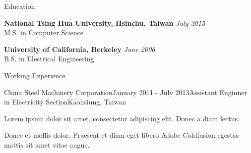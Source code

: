 \documentclass{resume} %
\begin{document}

\begin{rSection}{Education}

{\bf National Tsing Hua University, Hsinchu, Taiwan} \hfill {\em July 2015} \\ 
M.S. in Computer Science

{\bf University of California, Berkeley} \hfill {\em June 2006} \\ 
B.S. in Electrical Engineering

\end{rSection}


\begin{rSection}{Working Experience}

\begin{rSubsection}{China Steel Machinery Corporation}{January 2011 - July 2013}{Assistant Enginner in Electricity Section}{Kaohsiung, Taiwan}
\item Lorem ipsum dolor sit amet, consectetur adipiscing elit. Donec a diam lectus.
\item Donec et mollis dolor. Praesent et diam eget libero Adobe Coldfusion egestas mattis sit amet vitae augue.
\end{rSubsection}





\end{rSection}

\end{document}
